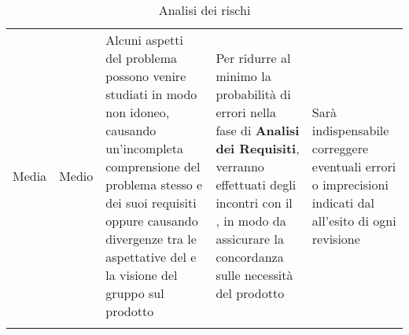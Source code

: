\begin{longtable}{p{2cm}!{\VRule[1pt]}p{2cm}!{\VRule[1pt]}p{3cm}!{\VRule[1pt]}p{3cm}!{\VRule[1pt]}p{3cm}}
Media	& Medio	& Alcuni aspetti del problema possono venire studiati in modo non idoneo, causando un'incompleta comprensione del problema stesso e dei suoi requisiti oppure causando divergenze tra le aspettative del  e la visione del gruppo sul prodotto	& Per ridurre al minimo la probabilità di errori nella fase di \textbf{Analisi dei Requisiti}, verranno effettuati degli incontri con il , in modo da assicurare la concordanza sulle necessità del prodotto	& Sarà indispensabile correggere eventuali errori o imprecisioni indicati dal  all'esito di ogni revisione \\
\caption{Analisi dei rischi}
\end{longtable}